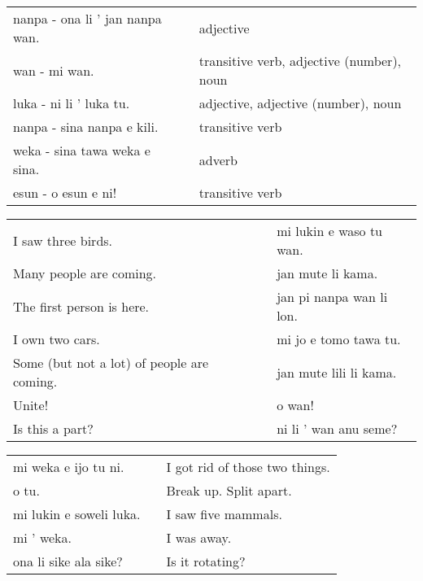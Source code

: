 \begin{supertabular}{p{5,5cm}|ll}
    nanpa - ona li ' jan nanpa wan. &  & adjective                                 \\ %
    wan - mi wan.                   &  & transitive verb, adjective (number), noun \\ %
    luka - ni li ' luka tu.         &  & adjective, adjective (number), noun       \\ %
    nanpa - sina nanpa e kili.      &  & transitive verb                           \\ %
    weka - sina tawa weka e sina.   &  & adverb                                    \\ %
    esun - o esun e ni!             &  & transitive verb                           \\ %
\end{supertabular}

\begin{supertabular}{p{5,5cm}|ll}
    I saw three birds.                         &  & mi lukin e waso tu wan.  \\ %
    Many people are coming.                    &  & jan mute li kama.        \\ %
    The first person is here.                  &  & jan pi nanpa wan li lon. \\ %
    I own two cars.                            &  & mi jo e tomo tawa tu.    \\ %
    Some (but not a lot) of people are coming. &  & jan mute lili li kama.   \\ %
    Unite!                                     &  & o wan!                   \\ %
    Is this a part?                            &  & ni li ' wan anu seme?    \\ %
\end{supertabular}

\begin{supertabular}{p{5,5cm}|ll}
    mi weka e ijo tu ni.    &  & I got rid of those two things. \\
    o tu.                   &  & Break up. Split apart.         \\
    mi lukin e soweli luka. &  & I saw five mammals.            \\
    mi ' weka.              &  & I was away.                    \\
    ona li sike ala sike?   &  & Is it rotating?                \\
\end{supertabular}

